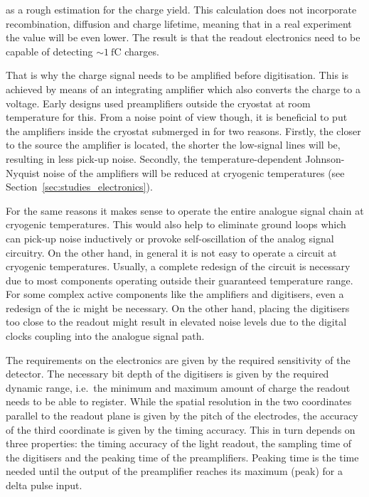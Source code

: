 as a rough estimation for the charge yield.
This calculation does not incorporate recombination, diffusion and charge lifetime, meaning that in a real experiment the value will be even lower.
The result is that the readout electronics need to be capable of detecting $\sim{\SI{1}{\femto\coulomb}}$ charges.

That is why the charge signal needs to be amplified before digitisation.
This is achieved by means of an integrating amplifier which also converts the charge to a voltage.
Early \lartpc{} designs used preamplifiers outside the cryostat at room temperature for this.
From a noise point of view though, it is beneficial to put the amplifiers inside the cryostat submerged in \lar{} for two reasons.
Firstly, the closer to the source the amplifier is located, the shorter the low-signal lines will be, resulting in less pick-up noise.
Secondly, the temperature-dependent Johnson-Nyquist noise of the amplifiers will be reduced at cryogenic temperatures (see Section~\ref{sec:studies_electronics}).

For the same reasons it makes sense to operate the entire analogue signal chain at cryogenic temperatures.
This would also help to eliminate ground loops which can pick-up noise inductively or provoke self-oscillation of the analog signal circuitry.
On the other hand, in general it is not easy to operate a circuit at cryogenic temperatures.
Usually, a complete redesign of the circuit is necessary due to most components operating outside their guaranteed temperature range.
For some complex active components like the amplifiers and digitisers, even a redesign of the \gls{ic} might be necessary.
On the other hand, placing the digitisers too close to the readout might result in elevated noise levels due to the digital clocks coupling into the analogue signal path.

The requirements on the electronics are given by the required sensitivity of the detector.
The necessary bit depth of the digitisers is given by the required dynamic range, i.e.\ the minimum and maximum amount of charge the readout needs to be able to register.
While the spatial resolution in the two coordinates parallel to the readout plane is given by the pitch of the electrodes, the accuracy of the third coordinate is given by the timing accuracy.
This in turn depends on three properties: the timing accuracy of the light readout, the sampling time of the digitisers and the peaking time of the preamplifiers.
Peaking time is the time needed until the output of the preamplifier reaches its maximum (peak) for a delta pulse input.


